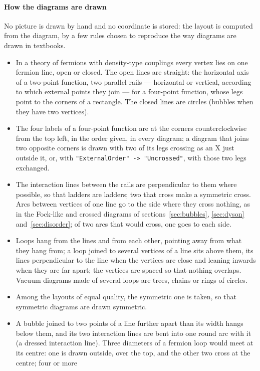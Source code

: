 \documentclass[11pt,a4paper]{article}
\newcommand{\pkg}[1]{\texttt{#1}}
\begin{document}
\paragraph{How the diagrams are drawn} No picture is drawn by hand and no coordinate is stored: the layout is computed
from the diagram, by a few rules chosen to reproduce the way diagrams are drawn in textbooks.
\begin{itemize}
\item In a theory of fermions with density-type couplings every vertex lies on one fermion line, open or closed. The
  open lines are straight: the horizontal axis of a two-point function, two parallel rails --- horizontal or vertical,
  according to which external points they join --- for a four-point function, whose legs point to the corners of a
  rectangle. The closed lines are circles (bubbles when they have two vertices).
\item The four labels of a four-point function are at the corners counterclockwise from the top left, in the order
  given, in every diagram; a diagram that joins two opposite corners is drawn with two of its legs crossing as an X just
  outside it, or, with \pkg{"ExternalOrder" -> "Uncrossed"}, with those two legs exchanged.
\item The interaction lines between the rails are perpendicular to them where possible, so that ladders are ladders; two
  that cross make a symmetric cross. Arcs between vertices of one line go to the side where they cross nothing, as in
  the Fock-like and crossed diagrams of sections~\ref{sec:bubbles}, \ref{sec:dyson} and~\ref{sec:disorder}; of two arcs
  that would cross, one goes to each side.
\item Loops hang from the lines and from each other, pointing away from what they hang from; a loop joined to several
  vertices of a line sits above them, its lines perpendicular to the line when the vertices are close and leaning
  inwards when they are far apart; the vertices are spaced so that nothing
  overlaps. Vacuum diagrams made of several loops are trees, chains or rings of circles.
\item Among the layouts of equal quality, the symmetric one is taken, so that symmetric diagrams are drawn symmetric.
\item A bubble joined to two points of a line further apart than its width hangs below them, and its two interaction
  lines are bent into one round arc with it (a dressed interaction line). Three diameters of a fermion loop
  would meet at its centre: one is drawn outside, over the top, and the other two cross at the centre; four or more

\end{itemize}
\end{document}

